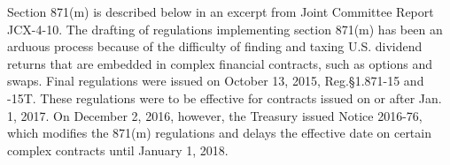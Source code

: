 %
%
%
%
%

Section 871(m) is described below in an excerpt  from Joint Committee Report JCX-4-10.  The drafting of regulations implementing section 871(m) has been an arduous process because of the difficulty of finding and taxing U.S. dividend returns that are embedded in complex financial contracts, such as options and swaps.  Final regulations were issued on October 13, 2015, Reg.\@ \S1.871-15 and -15T.  These regulations were to be effective for contracts issued on or after Jan. 1, 2017.  On December 2, 2016, however, the Treasury issued Notice 2016-76, which modifies the 871(m) regulations and delays the effective date on certain complex contracts until January 1, 2018. 
 
